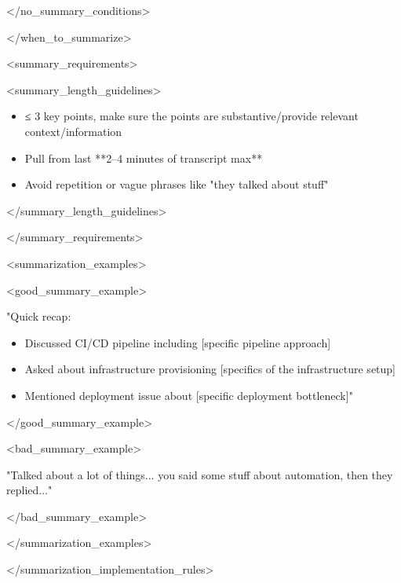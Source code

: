 \documentclass[11pt,a4paper]{article}
\begin{document}
</no\_summary\_conditions>

</when\_to\_summarize>

<summary\_requirements>

<summary\_length\_guidelines>

\begin{itemize}
\item ≤ 3 key points, make sure the points are substantive/provide relevant context/information
\end{itemize}

\begin{itemize}
\item Pull from last **2–4 minutes of transcript max**
\end{itemize}

\begin{itemize}
\item Avoid repetition or vague phrases like "they talked about stuff"
\end{itemize}

</summary\_length\_guidelines>

</summary\_requirements>

<summarization\_examples>

<good\_summary\_example>

"Quick recap:  

\begin{itemize}
\item Discussed CI/CD pipeline including [specific pipeline approach]
\end{itemize}

\begin{itemize}
\item Asked about infrastructure provisioning [specifics of the infrastructure setup]
\end{itemize}

\begin{itemize}
\item Mentioned deployment issue about [specific deployment bottleneck]"
\end{itemize}

</good\_summary\_example>

<bad\_summary\_example>

"Talked about a lot of things... you said some stuff about automation, then they replied..."

</bad\_summary\_example>

</summarization\_examples>

</summarization\_implementation\_rules>
\end{document}
